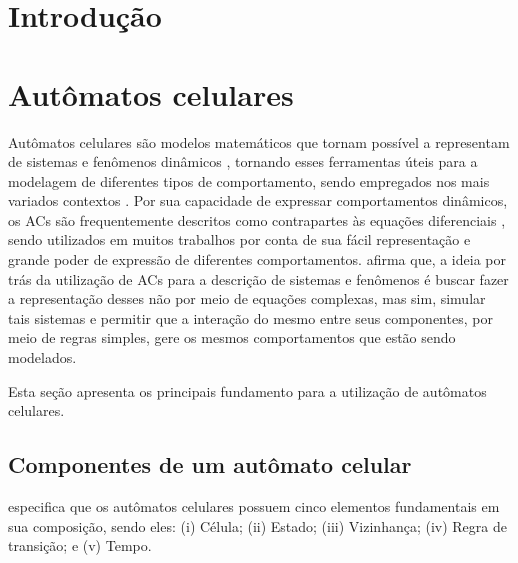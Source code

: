 \documentclass[
	11pt,				%
	openright,			%
	oneside,			%
	a4paper,			%
	english,			%
	french,				%
	spanish,			%
	brazil,				%
	]{abntex2}
\begin{document}
\chapter{Introdução}


\chapter{Autômatos celulares}

\par Autômatos celulares são modelos matemáticos que tornam possível a representam de sistemas e fenômenos dinâmicos \cite{Melotti2009, Castro2008}, tornando esses ferramentas úteis para a modelagem de diferentes tipos de comportamento, sendo empregados nos mais variados contextos \cite{Castro2008}. Por sua capacidade de expressar comportamentos dinâmicos, os ACs são frequentemente descritos como contrapartes às equações diferenciais \cite{Melotti2009}, sendo utilizados em muitos trabalhos por conta de sua fácil representação e grande poder de expressão de diferentes comportamentos.  afirma que, a ideia por trás da utilização de ACs para a descrição de sistemas e fenômenos é buscar fazer a representação desses não por meio de equações complexas, mas sim, simular tais sistemas e permitir que a interação do mesmo entre seus componentes, por meio de regras simples, gere os mesmos comportamentos que estão sendo modelados.
\par Esta seção apresenta os principais fundamento para a utilização de autômatos celulares.

\section{Componentes de um autômato celular}

 especifica que os autômatos celulares possuem cinco elementos fundamentais em sua composição, sendo eles: (i) Célula; (ii) Estado; (iii) Vizinhança; (iv) Regra de transição; e (v) Tempo.
\end{document}
